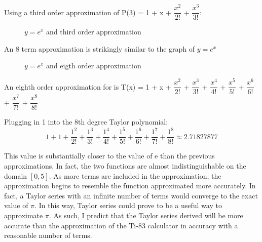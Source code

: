 \documentclass[12pt, titlepage]{article}
\begin{document}
Using a third order approximation of P(3) = 1 + x + \(\dfrac{x^{2}}{2!}\) + \(\dfrac{x^{3}}{3!}\):
\begin{figure}[H]
\centering
    \caption[]{\(y=e^x\) and third order approximation}
\end{figure}

An 8 term approximation is strikingly similar to the graph of \(y = e^{x}\)
\begin{figure}[H]
\centering
    \caption[]{\(y=e^x\) and eigth order approximation}
\end{figure}

An eighth order approximation for is T(x) = 1 + x + \(\dfrac{x^2}{2!}\) + \(\dfrac{x^3}{3!}\)
+ \(\dfrac{x^4}{4!}\) + \(\dfrac{x^5}{5!}\) + \(\dfrac{x^6}{6!}\) + \(\dfrac{x^7}{7!}\) + \(\dfrac{x^8}{8!}\)

Plugging in 1 into the 8th degree Taylor polynomial:
\begin{equation*}
  1 + 1 + \dfrac{1^2}{2!} + \dfrac{1^3}{3!} + \dfrac{1^4}{4!} + \dfrac{1^5}{5!} + \dfrac{1^6}{6!} + \dfrac{1^7}{7!} + \dfrac{1^8}{8!} \approx 2.71827877
\end{equation*}

This value is substantially closer to the value of e than the previous approximations. In fact, the two functions are almost indistinguishable on the domain \([0,5]\). As more terms are included in the approximation, the approximation begins to resemble the function approximated more accurately. In fact, a Taylor series with an infinite number of terms would converge to the exact value of \(\pi\). In this way, Taylor series could prove to be a useful way to approximate \(\pi\). As such, I predict that the Taylor series derived will be more accurate than the approximation of the Ti-83 calculator in accuracy with a reasonable number of terms.
\end{document}
